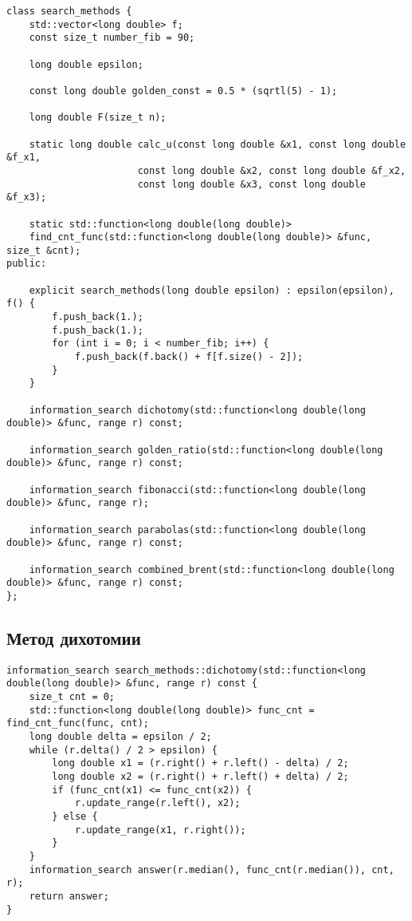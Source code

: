 \begin{lstlisting}
class search_methods {
    std::vector<long double> f;
    const size_t number_fib = 90;

    long double epsilon;

    const long double golden_const = 0.5 * (sqrtl(5) - 1);

    long double F(size_t n);

    static long double calc_u(const long double &x1, const long double &f_x1,
                       const long double &x2, const long double &f_x2,
                       const long double &x3, const long double &f_x3);
    
    static std::function<long double(long double)>
    find_cnt_func(std::function<long double(long double)> &func, size_t &cnt);
public:

    explicit search_methods(long double epsilon) : epsilon(epsilon), f() {
        f.push_back(1.);
        f.push_back(1.);
        for (int i = 0; i < number_fib; i++) {
            f.push_back(f.back() + f[f.size() - 2]);
        }
    }

    information_search dichotomy(std::function<long double(long double)> &func, range r) const;

    information_search golden_ratio(std::function<long double(long double)> &func, range r) const;

    information_search fibonacci(std::function<long double(long double)> &func, range r);

    information_search parabolas(std::function<long double(long double)> &func, range r) const;

    information_search combined_brent(std::function<long double(long double)> &func, range r) const;
};
\end{lstlisting}

\subsection {Метод дихотомии}

\begin{lstlisting}
information_search search_methods::dichotomy(std::function<long double(long double)> &func, range r) const {
	size_t cnt = 0;
	std::function<long double(long double)> func_cnt = find_cnt_func(func, cnt);
	long double delta = epsilon / 2;
	while (r.delta() / 2 > epsilon) {
		long double x1 = (r.right() + r.left() - delta) / 2;
		long double x2 = (r.right() + r.left() + delta) / 2;
		if (func_cnt(x1) <= func_cnt(x2)) {
			r.update_range(r.left(), x2);
		} else {
			r.update_range(x1, r.right());
		}
	}
	information_search answer(r.median(), func_cnt(r.median()), cnt, r);
	return answer;
}
\end{lstlisting}

